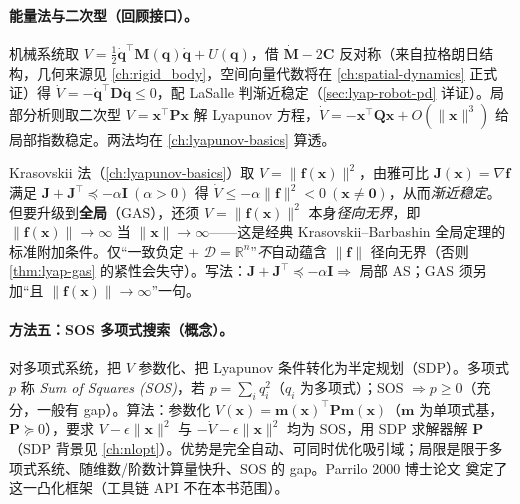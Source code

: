 \paragraph{能量法与二次型（回顾接口）。}
机械系统取 $V=\tfrac12\dot{\mathbf{q}}^\top\mathbf{M}(\mathbf{q})\dot{\mathbf{q}}+U(\mathbf{q})$，借 $\dot{\mathbf{M}}-2\mathbf{C}$ 反对称（来自拉格朗日结构，几何来源见 \cref{ch:rigid_body}，空间向量代数将在 \cref{ch:spatial-dynamics} 正式证）得 $\dot V=-\dot{\mathbf{q}}^\top\mathbf{D}\dot{\mathbf{q}}\le0$，配 LaSalle 判渐近稳定（\cref{sec:lyap-robot-pd} 详证）。局部分析则取二次型 $V=\mathbf{x}^\top\mathbf{P}\mathbf{x}$ 解 Lyapunov 方程，$\dot V=-\mathbf{x}^\top\mathbf{Q}\mathbf{x}+O(\|\mathbf{x}\|^3)$ 给局部指数稳定。两法均在 \cref{ch:lyapunov-basics} 算透。

\begin{pitfall}
Krasovskii 法（\cref{ch:lyapunov-basics}）取 $V=\|\mathbf{f}(\mathbf{x})\|^2$，由雅可比 $\mathbf{J}(\mathbf{x})=\nabla\mathbf{f}$ 满足 $\mathbf{J}+\mathbf{J}^\top\preceq-\alpha\mathbf{I}\ (\alpha>0)$ 得 $\dot V\le-\alpha\|\mathbf{f}\|^2<0\ (\mathbf{x}\neq\mathbf{0})$，从而\emph{渐近稳定}。但要升级到\textbf{全局}（GAS），还须 $V=\|\mathbf{f}(\mathbf{x})\|^2$ 本身\emph{径向无界}，即 $\|\mathbf{f}(\mathbf{x})\|\to\infty$ 当 $\|\mathbf{x}\|\to\infty$——这是经典 Krasovskii–Barbashin 全局定理的标准附加条件。仅“一致负定 + $\mathcal{D}=\mathbb{R}^n$”\emph{不}自动蕴含 $\|\mathbf{f}\|$ 径向无界（否则 \cref{thm:lyap-gas} 的紧性会失守）。写法：$\mathbf{J}+\mathbf{J}^\top\preceq-\alpha\mathbf{I}\Rightarrow$ 局部 AS；GAS 须另加“且 $\|\mathbf{f}(\mathbf{x})\|\to\infty$”一句。
\end{pitfall}

\paragraph{方法五：SOS 多项式搜索（概念）。}
对多项式系统，把 $V$ 参数化、把 Lyapunov 条件转化为半定规划（SDP）。多项式 $p$ 称 \emph{Sum of Squares (SOS)}，若 $p=\sum_i q_i^2$（$q_i$ 为多项式）；SOS $\Rightarrow p\ge0$（充分，一般有 gap）。算法：参数化 $V(\mathbf{x})=\mathbf{m}(\mathbf{x})^\top\mathbf{P}\mathbf{m}(\mathbf{x})$（$\mathbf{m}$ 为单项式基，$\mathbf{P}\succeq0$），要求 $V-\epsilon\|\mathbf{x}\|^2$ 与 $-\dot V-\epsilon\|\mathbf{x}\|^2$ 均为 SOS，用 SDP 求解器解 $\mathbf{P}$（SDP 背景见 \cref{ch:nlopt}）。优势是完全自动、可同时优化吸引域；局限是限于多项式系统、随维数/阶数计算量快升、SOS 的 gap。Parrilo 2000 博士论文\cite{parrilo2000structured} 奠定了这一凸化框架（工具链 API 不在本书范围）。

